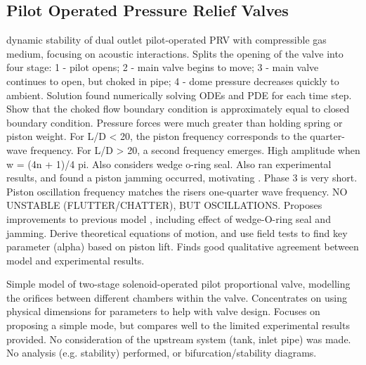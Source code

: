 \subsection{Pilot Operated Pressure Relief Valves}

\cite{Botros1997Riser-ReliefInteractions}
dynamic stability of dual outlet pilot-operated PRV with compressible gas medium, focusing on acoustic interactions. Splits the opening of the valve into four stage: 1 - pilot opens; 2 - main valve begins to move; 3 - main valve continues to open, but choked in pipe; 4 - dome pressure decreases quickly to ambient. Solution found numerically solving ODEs and PDE for each time step. Show that the choked flow boundary condition is approximately equal to closed boundary condition. Pressure forces were much greater than holding spring or piston weight. For L/D < 20, the piston frequency corresponds to the quarter-wave frequency. For L/D > 20, a second frequency emerges. High amplitude when w = (4n + 1)/4 pi. Also considers wedge o-ring seal. Also ran experimental results, and found a piston jamming occurred, motivating \cite{Botros1998Riser-ReliefModel}. Phase 3 is very short. Piston oscillation frequency matches the risers one-quarter wave frequency. NO UNSTABLE (FLUTTER/CHATTER), BUT OSCILLATIONS.
\cite{Botros1998Riser-ReliefModel}
Proposes improvements to previous model \cite{Botros1997Riser-ReliefInteractions}, including effect of wedge-O-ring seal and jamming. Derive theoretical equations of motion, and use field tests to find key parameter (alpha) based on piston lift. Finds good qualitative agreement between model and experimental results.

\cite{Zung2002NonlinearDesigners}
Simple model of two-stage solenoid-operated pilot proportional valve, modelling the orifices between different chambers within the valve. Concentrates on using physical dimensions for parameters to help with valve design. Focuses on proposing a simple mode, but compares well to the limited experimental results provided. No consideration of the upstream system (tank, inlet pipe) was made. No analysis (e.g. stability) performed, or bifurcation/stability diagrams.

